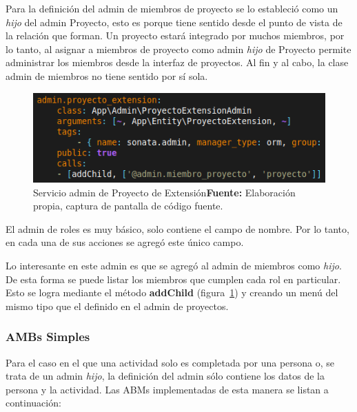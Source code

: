 Para la definición del admin de miembros de proyecto se lo estableció como un \textit{hijo} del admin Proyecto, esto es porque tiene sentido desde el punto
de vista de la relación que forman. Un proyecto estará integrado por muchos miembros, por lo tanto, al asignar a miembros de proyecto como admin \textit{hijo}
de Proyecto permite administrar los miembros desde la interfaz de proyectos. Al fin y al cabo, la clase admin de miembros no tiene sentido por sí sola.



\begin{figure}[h!]
    \includegraphics[width=1\linewidth]{image/addChild.png}
    \caption{Servicio admin de Proyecto de Extensión\newline \textbf{Fuente:} Elaboración propia, captura de pantalla de código fuente.}
    \label{fig:image/addChild}
\end{figure}

%

El admin de roles es muy básico, solo contiene el campo de nombre. Por lo tanto, en cada una de sus acciones se agregó este único campo.


Lo interesante en este admin es que se agregó al admin de miembros como \textit{hijo}. De esta forma se puede listar los miembros que cumplen cada rol en
particular.
Esto se logra mediante el método \textbf{addChild} (figura~\ref{fig:image/addChild}) y creando un menú del mismo tipo que el definido en el admin de proyectos.

\subsubsection{AMBs Simples}%
\label{ssub:ambs_simples}

Para el caso en el que una actividad solo es completada por una persona o, se trata de un admin \textit{hijo}, la definición del admin sólo contiene los datos de la persona y la actividad\@. Las ABMs
implementadas de esta manera se listan a continuación:

\begin{itemize}
        
\end{itemize}

